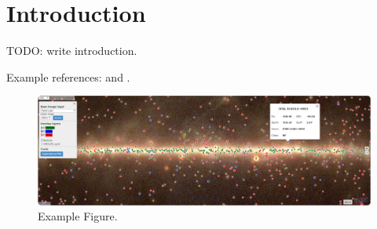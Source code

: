 \section{Introduction}

TODO: write introduction.

Example references: \cite{2015arXiv150907408D} and \citep{2016arXiv160600393K}.

\begin{figure}[tb]
  \centerline{\includegraphics[width=\textwidth]{figures/fig1}}
  \caption{Example Figure.}
\end{figure}

% 
